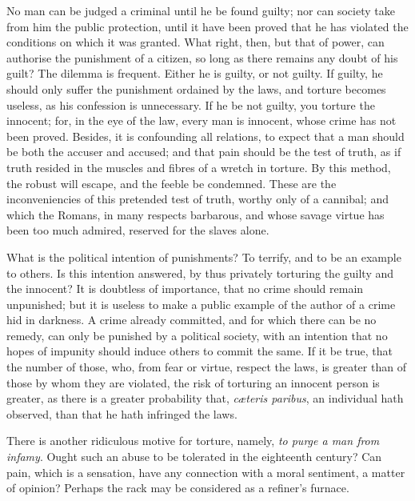 No man can be judged a criminal until he be found guilty; nor can
society take from him the public protection, until it have been proved
that he has violated the conditions on which it was granted. What
right, then, but that of power, can authorise the punishment of a
citizen, so long  as there remains any doubt of his guilt?
The dilemma is frequent. Either he is guilty, or not guilty. If
guilty, he should only suffer the punishment ordained by the laws, and
torture becomes useless, as his confession is unnecessary. If he be
not guilty, you torture the innocent; for, in the eye of the law,
every man is innocent, whose crime has not been proved. Besides, it is
confounding all relations, to expect that a man should be both the
accuser and accused; and that pain should be the test of truth, as if
truth resided in the muscles and fibres of a wretch in torture. By
this method, the robust will escape, and the feeble be condemned.
These are the inconveniencies of this pretended test of truth, worthy
only of a cannibal; and which the Romans, in many respects barbarous,
and whose savage virtue has been too much admired, reserved for the
slaves alone.

What is the political intention of punishments? To terrify, and to be
an example to others. Is this intention answered, by thus privately
torturing the guilty and the innocent? It is doubtless of importance,
that no crime should remain unpunished; but it is useless to make a
public example of the author of a crime hid in darkness. A crime
already committed, and for which there can be no remedy, can only be
punished by a  political society, with an intention that no
hopes of impunity should induce others to commit the same. If it be
true, that the number of those, who, from fear or virtue, respect the
laws, is greater than of those by whom they are violated, the risk of
torturing an innocent person is greater, as there is a greater
probability that, \textit{c\ae teris paribus}, an individual hath
observed, than that he hath infringed the laws.

There is another ridiculous motive for torture, namely, \textit{to
purge a man from infamy}. Ought such an abuse to be tolerated in the
eighteenth century? Can pain, which is a sensation, have any
connection with a moral sentiment, a matter of opinion? Perhaps the
rack may be considered as a refiner's furnace.


